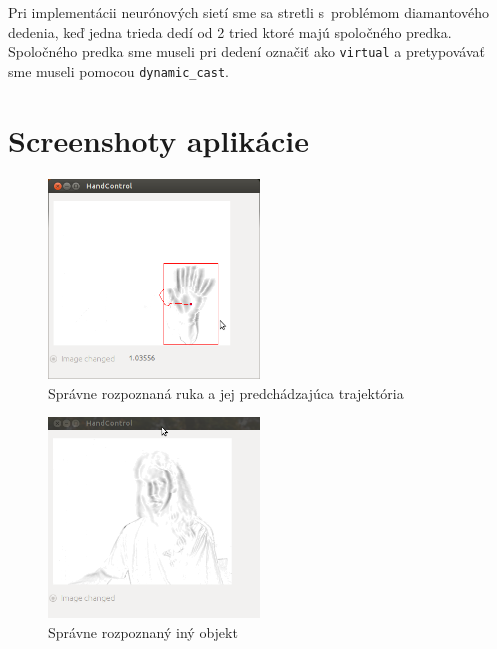 Pri implementácii neurónových sietí sme sa stretli s~problémom diamantového dedenia, keď  jedna trieda dedí od 2 tried ktoré majú spoločného predka. 
Spoločného predka sme museli pri dedení označiť ako {\tt virtual} a pretypovávať sme museli pomocou {\tt dynamic\_cast}.
\eject

\section{Screenshoty aplikácie}


\begin{figure}[h]
    \centering
    \includegraphics[width=0.5\textwidth]{images/Screenshot_ruka}
    \caption{Správne rozpoznaná ruka a jej predchádzajúca trajektória }
\end{figure}

\begin{figure}[h]
    \centering
    \includegraphics[width=0.5\textwidth]{images/Screenshot_clovek}
    \caption{Správne rozpoznaný iný objekt}
\end{figure}


